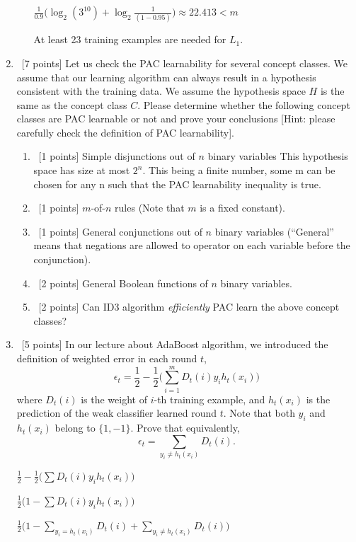 \documentclass[12pt, fullpage,letterpaper]{article}
\begin{document}
\begin{enumerate}
\begin{enumerate}
	$\frac{1}{0.9}\big(\log_2(3^{10}) + \log_2\frac{1}{(1-0.95)}\big) \approx 22.413 < m$
	
	At least 23 training examples are needed for $L_1$.
	\bigskip
\end{enumerate}

\item~[7 points] Let us check the PAC learnability for several concept classes. We assume that our learning algorithm can always result in a hypothesis consistent with the training data. We assume the hypothesis space $H$ is the same as the concept class $C$. Please determine whether the following concept classes are PAC learnable or not and prove your conclusions [Hint: please carefully check the definition of PAC learnability]. 
\begin{enumerate}
	\item~[1 points] Simple disjunctions out of $n$ binary variables
	\bigskip\newline
	This hypothesis space has size at most $2^n$. This being a finite number, some m can be chosen for any n such that the PAC learnability inequality is true.
	\bigskip
	\item~[1 points] $m$-of-$n$ rules (Note that $m$ is a fixed constant).  
	\item~[1 points] General conjunctions out of $n$ binary variables (``General'' means that negations are allowed to operator on each variable before the conjunction).
	\item~[2 points] General Boolean functions of $n$ binary variables. 
	\item~[2 points] Can ID3 algorithm \textit{efficiently} PAC learn the above concept classes? 
\end{enumerate}

\item~[5 points] In our lecture about AdaBoost algorithm, we introduced the definition of weighted error in each round $t$, 
\[
\epsilon_t = \frac{1}{2} - \frac{1}{2}\big(\sum_{i=1}^m D_t(i) y_i h_t(x_i)\big)
\]
where $D_t(i)$ is the weight of $i$-th training example, and $h_t(x_i)$ is the prediction of the weak classifier learned round $t$. Note that both $y_i$ and $h_t(x_i)$ belong to $\{1, -1\}$. Prove that equivalently,
\[
\epsilon_t = \sum_{y_i \neq h_t(x_i)} D_t(i).
\]

\bigskip
$\frac{1}{2} - \frac{1}{2}\big(\sum D_t(i) y_i h_t(x_i)\big)$

$\frac{1}{2}\big(1 - \sum D_t(i) y_i h_t(x_i)\big)$

$\frac{1}{2}\big(1 - \sum_{y_i = h_t(x_i)} D_t(i) + \sum_{y_i \neq h_t(x_i)} D_t(i)\big)$


\end{enumerate}
\end{document}

